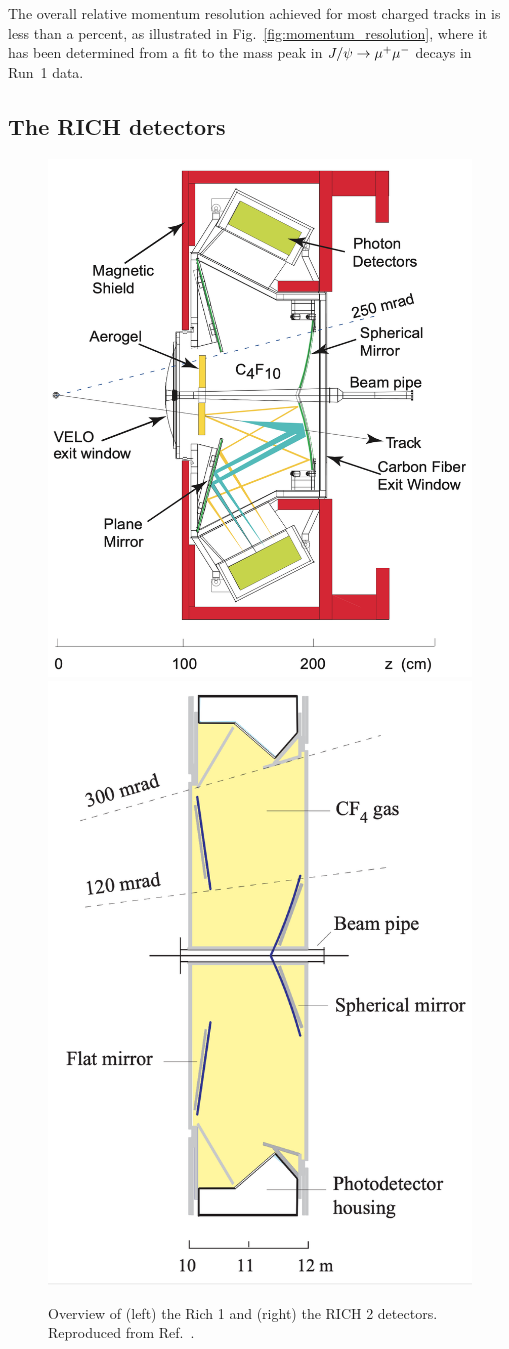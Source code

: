 The overall relative momentum resolution achieved for most charged tracks in \lhcb is less than a percent, as illustrated in Fig.~\ref{fig:momentum_resolution}, where it has been determined from a fit to the mass peak in $J/\psi\rightarrow{\ensuremath{\mu^+}}\mu^-$ decays in Run~1 data. 


\subsection{The RICH detectors} %
\label{sub:the_rich}

\begin{figure}[tb]
    \centering
    \includegraphics[width=0.45\columnwidth]{figures/detector/RICH1.png}
    \includegraphics[width=0.4\columnwidth]{figures/detector/RICH2.png}
    \caption{Overview of (left) the Rich 1 and (right) the RICH 2 detectors. Reproduced from Ref.~\cite{LHCb-detector,RICH-TDR}.}
    \label{fig:RICHes}
\end{figure}


